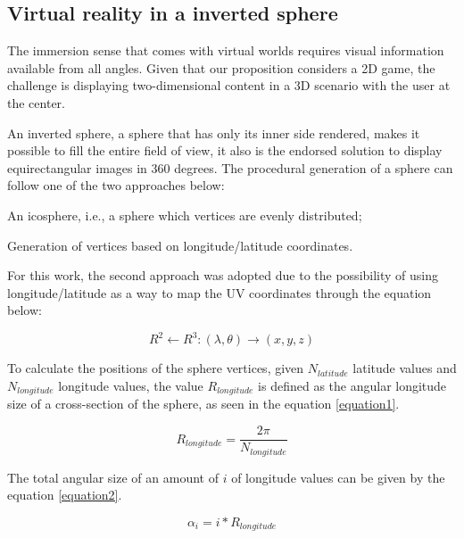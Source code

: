\documentclass[runningheads]{llncs}
\begin{document}
\subsection{Virtual reality in a inverted sphere}
\label{subsec:inverted-sphere}
The immersion sense that comes with virtual worlds requires visual information available from all angles. Given that our proposition considers a 2D game, the challenge is displaying two-dimensional content in a 3D scenario with the user at the center.

An inverted sphere, a sphere that has only its inner side rendered, makes it possible to fill the entire field of view, it also is the endorsed solution to display equirectangular images in 360 degrees. The procedural generation of a sphere can follow one of the two approaches below:

\begin{enumerate}
  \begin{item} An icosphere, i.e., a sphere which vertices are evenly distributed;
 \end{item}
  \begin{item} Generation of vertices based on longitude/latitude coordinates. \end{item}
\end{enumerate}

For this work, the second approach was adopted due to the possibility of using longitude/latitude as a way to map the UV coordinates through the equation below:

\begin{equation}
R^2 \leftarrow R^3 : (\lambda, \theta) \rightarrow (x, y, z)
\label{equation1}
\end{equation}

To calculate the positions of the sphere vertices, given $N_{latitude}$ latitude values  and $N_{longitude}$ longitude values, the value $R_{longitude}$ is defined as the angular longitude size of a cross-section of the sphere, as seen in the equation \ref{equation1}.

\begin{equation}
R_{longitude} = \frac{2 \pi}{N_{longitude}}
\label{equation1}
\end{equation}

The total angular size of an amount of $i$ of longitude values can be given by the equation \ref{equation2}.

\begin{equation}
\alpha_{i} = i * R_{longitude}
\label{equation2}
\end{equation}
\end{document}
